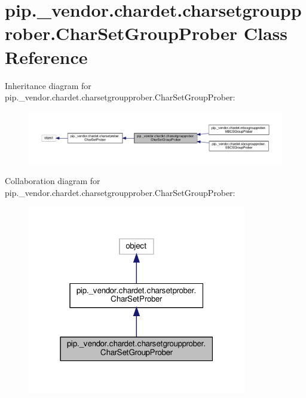 \hypertarget{classpip_1_1__vendor_1_1chardet_1_1charsetgroupprober_1_1CharSetGroupProber}{}\section{pip.\+\_\+vendor.\+chardet.\+charsetgroupprober.\+Char\+Set\+Group\+Prober Class Reference}
\label{classpip_1_1__vendor_1_1chardet_1_1charsetgroupprober_1_1CharSetGroupProber}


Inheritance diagram for pip.\+\_\+vendor.\+chardet.\+charsetgroupprober.\+Char\+Set\+Group\+Prober\+:
\nopagebreak
\begin{figure}[H]
\begin{center}
\leavevmode
\includegraphics[width=350pt]{classpip_1_1__vendor_1_1chardet_1_1charsetgroupprober_1_1CharSetGroupProber__inherit__graph}
\end{center}
\end{figure}


Collaboration diagram for pip.\+\_\+vendor.\+chardet.\+charsetgroupprober.\+Char\+Set\+Group\+Prober\+:
\nopagebreak
\begin{figure}[H]
\begin{center}
\leavevmode
\includegraphics[width=271pt]{classpip_1_1__vendor_1_1chardet_1_1charsetgroupprober_1_1CharSetGroupProber__coll__graph}
\end{center}
\end{figure}
